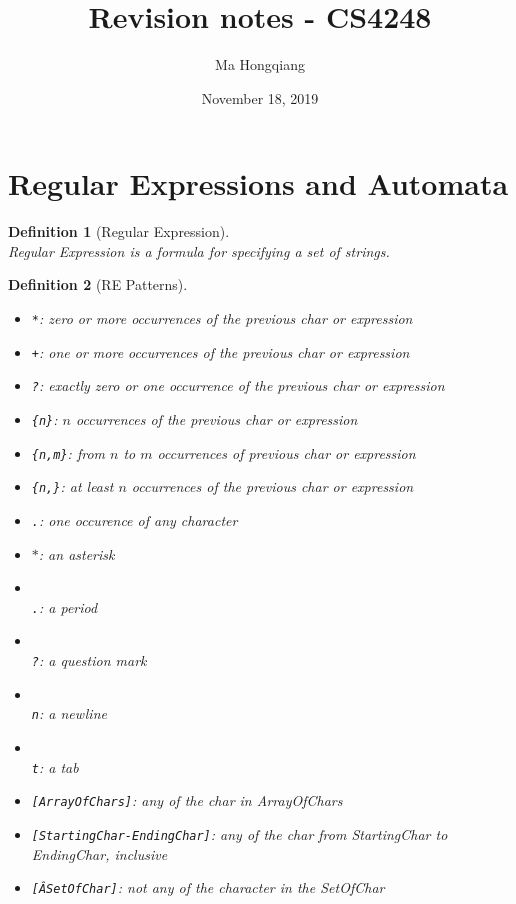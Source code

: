 \documentclass[12pt]{article}
\newtheorem{definition}{Definition}[section]
\theoremstyle{definition}
\begin{document}
\title{Revision notes - CS4248}
\author{Ma Hongqiang}
\date{November 18, 2019}
\maketitle
\tableofcontents

\clearpage
\section{Regular Expressions and Automata}
\begin{definition}[Regular Expression]
\hfill\\\normalfont Regular Expression is a formula for specifying a set of strings.
\end{definition}
\begin{definition}[RE Patterns]
\hfill\\\normalfont 
\begin{itemize}
	\item \texttt{*}: zero or more occurrences of the previous char or expression
	\item \texttt{+}: one or more occurrences of the previous char or expression
	\item \texttt{?}: exactly zero or one occurrence of the previous char or expression
	\item \texttt{\{n\}}: $n$ occurrences of the previous char or expression
	\item \texttt{\{n,m\}}: from $n$ to $m$ occurrences of previous char or expression
	\item \texttt{\{n,\}}: at least $n$ occurrences of the previous char or expression
	\item \texttt{.}: one occurence of any character
	\item \texttt{$\ast$}: an asterisk
	\item \texttt{\\.}: a period
	\item \texttt{\\?}: a question mark
	\item \texttt{\\n}: a newline
	\item \texttt{\\t}: a tab
	\item \texttt{[ArrayOfChars]}: any of the char in ArrayOfChars
	\item \texttt{[StartingChar-EndingChar]}: any of the char from StartingChar to EndingChar, inclusive
	\item \texttt{[\^ASetOfChar]}: not any of the character in the SetOfChar

\end{itemize}
\end{definition}
\end{document}

